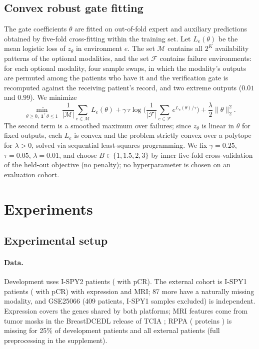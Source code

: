 \documentclass[a4paper,runningheads]{llncs}
\begin{document}
\subsection{Convex robust gate fitting}

The gate coefficients $\theta$ are fitted on out-of-fold expert and auxiliary predictions obtained by five-fold cross-fitting within the training set. Let $L_e(\theta)$ be the mean logistic loss of $z_\theta$ in environment $e$. The set $\mathcal M$ contains all $2^K$ availability patterns of the optional modalities, and the set $\mathcal F$ contains failure environments: for each optional modality, four sample swaps, in which the modality's outputs are permuted among the patients who have it and the verification gate is recomputed against the receiving patient's record, and two extreme outputs ($0.01$ and $0.99$). We minimize
\begin{equation}
 \min_{\theta\ge0,\ \mathbf 1^\top\theta\le1}\;
 \frac1{|\mathcal M|}\sum_{e\in\mathcal M}L_e(\theta)
 +\gamma\,\tau\log\Big(\frac1{|\mathcal F|}\sum_{e\in\mathcal F}e^{L_e(\theta)/\tau}\Big)
 +\frac\lambda2\|\theta\|_2^2 .
 \label{eq:objective}
\end{equation}
The second term is a smoothed maximum over failures; since $z_\theta$ is linear in $\theta$ for fixed outputs, each $L_e$ is convex and the problem strictly convex over a polytope for $\lambda>0$, solved via sequential least-squares programming. We fix $\gamma=0.25$, $\tau=0.05$, $\lambda=0.01$, and choose $B\in\{1,1.5,2,3\}$ by inner five-fold cross-validation of the held-out objective (no penalty); no hyperparameter is chosen on an evaluation cohort.

\section{Experiments}

\subsection{Experimental setup}

\paragraph{Data.} Development uses \NDev{} I-SPY2 patients (\NDevPos{} with pCR). The external cohort is \NExt{} I-SPY1 patients (\NExtPos{} with pCR) with expression and MRI; 87 more have a naturally missing modality, and GSE25066 \cite{hatzis2011} (409 patients, I-SPY1 samples excluded) is independent. Expression covers the \NGenes{} genes shared by both platforms; MRI features come from tumor masks in the BreastDCEDL release \cite{fridman2026} of TCIA \cite{tciaispy1,tciaispy2}; RPPA (\NRppaFeat{} proteins \cite{wolf2022ispy}) is missing for 25\% of development patients and all external patients (full preprocessing in the supplement).
\end{document}
